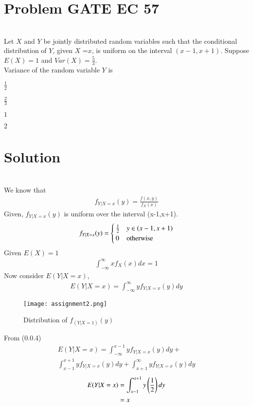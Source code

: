 \documentclass[journal,12pt,twocolumn]{IEEEtran}
\begin{document}
\section*{{Problem GATE EC 57}}\\
Let $X$ and $Y$ be jointly distributed random variables such that the conditional distribution of $Y$, given $X$ =$x$, is uniform on the interval $(x-1,x+1)$. Suppose $E(X)=1$ and $Var(X)=\frac{5}{3}$.
\\
 Variance of the random variable $Y$ is 
\begin{enumerate}[(A)]
\begin{multicols}{2}
\setlength\itemsep{1em}
\item $ \frac{1}{2}$\\
\item $\frac{2}{3}$\\
\item $1$\\
\item $2$
\end{multicols}
\end{enumerate}
\section*{{Solution}}\\
We know that
\begin{align}
    f_{Y|X=x}(y)=\frac{f(x,y)}{f_{X}(x)}
\end{align}
Given, $f_{Y|X=x}(y)$ is uniform over the interval (x-1,x+1).
\begin{align}
    f_{Y|X=x}(y)=
    \begin{cases}
    \frac{1}{2} & y \in \left(x-1,x+1\right)\\
    0 & \text{otherwise}
    \end{cases}
\end{align}
Given $E(X)=1$
\begin{align}
    \int_{-\infty}^{\infty}x f_{X}(x)dx=1
\end{align}
Now consider $E(Y|X=x)$,
\begin{align}
    E(Y|X=x)=\int_{-\infty}^{\infty}y f_{Y|X=x}(y)dy
\end{align}
\begin{figure}[H]
    \centering
    \texttt{[image: assignment2.png]}
    \caption{Distribution of $f_{(Y|X=1)}(y)$}
\end{figure}
From (0.0.4)
\begin{multline}
     E(Y|X=x)=\int_{-\infty}^{x-1}yf_{Y|X=x}(y)dy+\\ \int_{x-1}^{x+1}yf_{Y|X=x}(y)dy+\int_{x+1}^{\infty}yf_{Y|X=x}(y)dy
\end{multline}
\begin{align}
     E(Y|X=x)&=\int_{x-1}^{x+1}y\left(\frac{1}{2}\right)dy\\
    &=x
\end{align}
\end{document}
